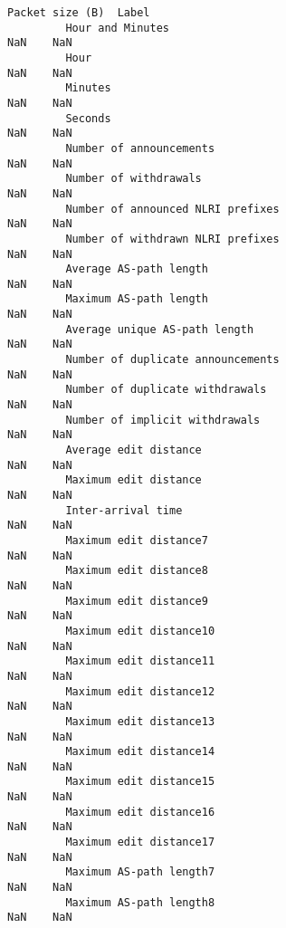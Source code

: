 \documentclass[11pt]{article}
\begin{document}
\begin{Verbatim}[commandchars=\\\{\}]
                                                            Packet size (B)  Label  
         Hour and Minutes                                               NaN    NaN  
         Hour                                                           NaN    NaN  
         Minutes                                                        NaN    NaN  
         Seconds                                                        NaN    NaN  
         Number of announcements                                        NaN    NaN  
         Number of withdrawals                                          NaN    NaN  
         Number of announced NLRI prefixes                              NaN    NaN  
         Number of withdrawn NLRI prefixes                              NaN    NaN  
         Average AS-path length                                         NaN    NaN  
         Maximum AS-path length                                         NaN    NaN  
         Average unique AS-path length                                  NaN    NaN  
         Number of duplicate announcements                              NaN    NaN  
         Number of duplicate withdrawals                                NaN    NaN  
         Number of implicit withdrawals                                 NaN    NaN  
         Average edit distance                                          NaN    NaN  
         Maximum edit distance                                          NaN    NaN  
         Inter-arrival time                                             NaN    NaN  
         Maximum edit distance7                                         NaN    NaN  
         Maximum edit distance8                                         NaN    NaN  
         Maximum edit distance9                                         NaN    NaN  
         Maximum edit distance10                                        NaN    NaN  
         Maximum edit distance11                                        NaN    NaN  
         Maximum edit distance12                                        NaN    NaN  
         Maximum edit distance13                                        NaN    NaN  
         Maximum edit distance14                                        NaN    NaN  
         Maximum edit distance15                                        NaN    NaN  
         Maximum edit distance16                                        NaN    NaN  
         Maximum edit distance17                                        NaN    NaN  
         Maximum AS-path length7                                        NaN    NaN  
         Maximum AS-path length8                                        NaN    NaN  

\end{Verbatim}
\end{document}
